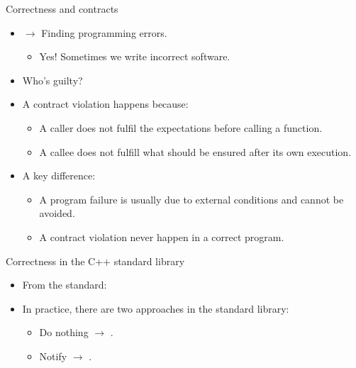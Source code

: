\begin{frame}[t]{Correctness and contracts}
\begin{itemize}
  \item {} $\rightarrow$ Finding programming errors.
    \begin{itemize}
      \item Yes! Sometimes we write incorrect software.
    \end{itemize}

  \vfill\pause
  \item Who's guilty?
  \item A contract violation happens because:
    \begin{itemize}
      \item A caller does not fulfil the expectations before calling a function.
      \item A callee does not fulfill what should be ensured after its own
execution.
    \end{itemize}
  \vfill\pause
  \item A key difference:
    \begin{itemize}
      \item A program failure is usually due to external conditions and cannot
be avoided.
      \item A contract violation  never happen in a
correct program.
    \end{itemize}
\end{itemize}
\end{frame}

\begin{frame}[t]{Correctness in the C++ standard library}
\begin{itemize}
  \item From the standard:
\end{itemize}
\vspace{.25ex}
  \vfill\pause
\begin{itemize}
  \item In practice, there are two approaches in the standard library:
    \begin{itemize}
      \item Do nothing $\rightarrow$ .
      \item Notify $\rightarrow$ .
    \end{itemize}
\end{itemize}
\end{frame}
